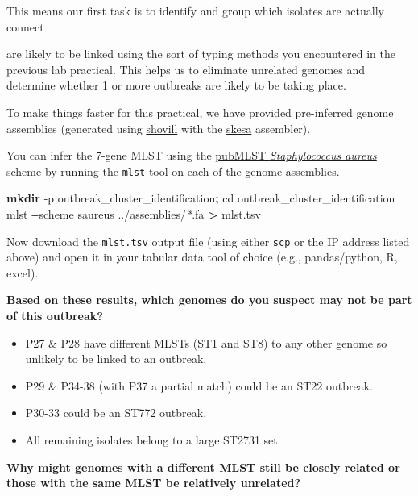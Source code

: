 \documentclass[
]{book}
\newenvironment{Shaded}{\begin{snugshade}}{\end{snugshade}}
\newcommand{\AttributeTok}[1]{\textcolor[rgb]{0.13,0.29,0.53}{#1}}
\newcommand{\BuiltInTok}[1]{#1}
\newcommand{\ExtensionTok}[1]{#1}
\newcommand{\FunctionTok}[1]{\textcolor[rgb]{0.13,0.29,0.53}{\textbf{#1}}}
\newcommand{\KeywordTok}[1]{\textcolor[rgb]{0.13,0.29,0.53}{\textbf{#1}}}
\newcommand{\NormalTok}[1]{#1}
\newcommand{\OperatorTok}[1]{\textcolor[rgb]{0.81,0.36,0.00}{\textbf{#1}}}
\newcommand{\PreprocessorTok}[1]{\textcolor[rgb]{0.56,0.35,0.01}{\textit{#1}}}
\providecommand{\tightlist}{%
  \setlength{\itemsep}{0pt}\setlength{\parskip}{0pt}}
\begin{document}
This means our first task is to identify and group which isolates are actually connect

are likely to be linked using the sort of typing methods you encountered in the previous lab practical.
This helps us to eliminate unrelated genomes and determine whether 1 or more outbreaks are likely to be taking place.

To make things faster for this practical, we have provided pre-inferred genome assemblies (generated using \href{https://github.com/tseemann/shovill}{shovill} with the \href{https://github.com/ncbi/SKESA}{skesa} assembler).

You can infer the 7-gene MLST using the \href{https://pubmlst.org/organisms/staphylococcus-aureus}{pubMLST \emph{Staphylococcus aureus} scheme} by running the \texttt{mlst} tool on each of the genome assemblies.

\begin{Shaded}
\begin{Highlighting}[]
\FunctionTok{mkdir} \AttributeTok{{-}p}\NormalTok{ outbreak\_cluster\_identification}\KeywordTok{;} \BuiltInTok{cd}\NormalTok{ outbreak\_cluster\_identification}
\ExtensionTok{mlst} \AttributeTok{{-}{-}scheme}\NormalTok{ saureus ../assemblies/}\PreprocessorTok{*}\NormalTok{.fa }\OperatorTok{\textgreater{}}\NormalTok{ mlst.tsv}
\end{Highlighting}
\end{Shaded}

Now download the \texttt{mlst.tsv} output file (using either \texttt{scp} or the IP address listed above) and open it in your tabular data tool of choice (e.g., pandas/python, R, excel).

\textbf{Based on these results, which genomes do you suspect may not be part of this outbreak?}

\begin{itemize}
\tightlist
\item
  P27 \& P28 have different MLSTs (ST1 and ST8) to any other genome so unlikely to be linked to an outbreak.
\item
  P29 \& P34-38 (with P37 a partial match) could be an ST22 outbreak.
\item
  P30-33 could be an ST772 outbreak.
\item
  All remaining isolates belong to a large ST2731 set
\end{itemize}

\textbf{Why might genomes with a different MLST still be closely related or those with the same MLST be relatively unrelated?}
\end{document}
